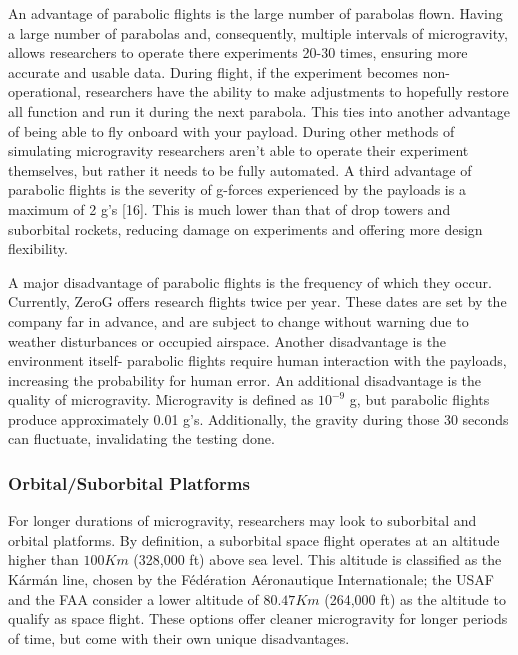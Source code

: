 An advantage of parabolic flights is the large number of parabolas flown. Having a large number of parabolas and, consequently, multiple intervals of microgravity, allows researchers to operate there experiments 20-30 times, ensuring more accurate and usable data. During flight, if the experiment becomes non-operational, researchers have the ability to make adjustments to hopefully restore all function and run it during the next parabola. This ties into another advantage of being able to fly onboard with your payload. During other methods of simulating microgravity researchers aren't able to operate their experiment themselves, but rather it needs to be fully automated. A third advantage of parabolic flights is the severity of g-forces experienced by the payloads is a maximum of 2 g's [16]. This is much lower than that of drop towers and suborbital rockets, reducing damage on experiments and offering more design flexibility.

A major disadvantage of parabolic flights is the frequency of which they occur. Currently, ZeroG offers research flights twice per year. These dates are set by the company far in advance, and are subject to change without warning due to weather disturbances or occupied airspace. Another disadvantage is the environment itself- parabolic flights require human interaction with the payloads, increasing the probability for human error. An additional disadvantage is the quality of microgravity. Microgravity is defined as $10^{\minus 9}$ g, but parabolic flights produce approximately 0.01 g's. Additionally, the gravity during those 30 seconds can fluctuate, invalidating the testing done.


\subsubsection{Orbital/Suborbital Platforms}

\indent\indent For longer durations of microgravity, researchers may look to suborbital and orbital platforms. By definition, a suborbital space flight operates at an altitude higher than $100 Km$ (328,000 ft) above sea level. This altitude is classified as the Kármán line, chosen by the Fédération Aéronautique Internationale; the USAF and the FAA consider a lower altitude of $80.47 Km$ (264,000 ft) as the altitude to qualify as space flight. These options offer cleaner microgravity for longer periods of time, but come with their own unique disadvantages. 

